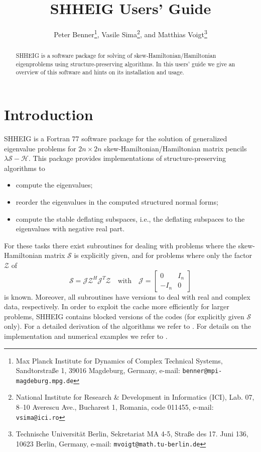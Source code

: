 \documentclass[a4paper,10pt]{article}
\newcommand{\cH}{\mathcal{H}}
\newcommand{\cJ}{\mathcal{J}}
\newcommand{\cS}{\mathcal{S}}
\newcommand{\cZ}{\mathcal{Z}}
\begin{document}
%
\title{SHHEIG Users' Guide}
\author{
Peter Benner\thanks{Max Planck Institute for Dynamics of Complex Technical Systems, Sandtorstra{\ss}e 1, 39016 Magdeburg, Germany, e-mail: \texttt{benner@mpi-magdeburg.mpg.de}},
Vasile Sima\thanks{National Institute for Research \& Development in Informatics (ICI), Lab. 07, 8--10 Averescu Ave., Bucharest 1, Romania, code 011455, e-mail: \texttt{vsima@ici.ro}}, and
Matthias Voigt\thanks{Technische Universit\"at Berlin, Sekretariat MA 4-5, Stra{\ss}e des 17. Juni 136, 10623 Berlin, Germany, e-mail: \texttt{mvoigt@math.tu-berlin.de}}
}
%
\maketitle
%
\begin{abstract}
SHHEIG is a software package for solving of skew-Hamiltonian/Ha\-miltonian eigenproblems using structure-preserving algorithms. In this users' guide we give an overview of this software and hints on its installation and usage.
\end{abstract}
%
\section{Introduction}
%
SHHEIG is a Fortran 77 software package for the solution of generalized eigenvalue problems for $2n \times 2n$ skew-Hamiltonian/Hamiltonian matrix pencils $\lambda \cS - \cH$. This package provides implementations of structure-preserving algorithms to 
\begin{itemize}
 \item compute the eigenvalues;
 \item reorder the eigenvalues in the computed structured normal forms;
 \item compute the stable deflating subspaces, i.e., the deflating subspaces to the eigenvalues with negative real part.
\end{itemize}
For these tasks there exist subroutines for dealing with problems where the skew-Hamiltonian matrix $\cS$ is explicitly given, and for problems where only the factor $\cZ$ of 
\begin{equation*}
 \cS = \cJ \cZ^H \cJ^T \cZ \quad \text{with} \quad \cJ = \begin{bmatrix} 0 & I_n \\ -I_n & 0 \end{bmatrix}
\end{equation*}
is known. Moreover, all subroutines have versions to deal with real and complex data, respectively. In order to exploit the cache more efficiently for larger problems, SHHEIG contains blocked versions of the codes (for explicitly given $\cS$ only). For a detailed derivation of the algorithms we refer to \cite{BenBMX01,BenBLMX07}. For details on the implementation and numerical examples we refer to \cite{BenSV14}.
\end{document}
